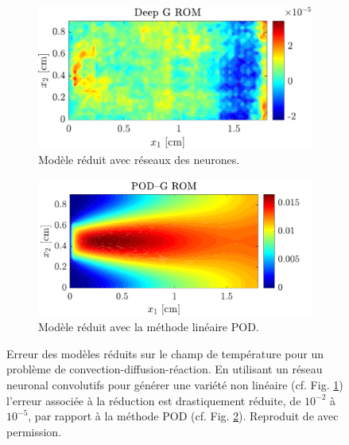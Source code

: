\documentclass[12pt, french]{article}
\begin{document}
	\begin{figure}[t]
		\begin{subfigure}[t]{0.465\textwidth}
			\includegraphics[width=\columnwidth]{DGROM_T_param1.pdf} 
			\caption{Modèle réduit avec réseaux des neurones.}
			\label{fig:DG_ROM}
		\end{subfigure}\hfill
		\begin{subfigure}[t]{0.48\textwidth}
			\includegraphics[width=\columnwidth]{GROM_T_param1.pdf}%
			\caption{Modèle réduit avec la méthode linéaire POD.}
			\label{fig:POD_ROM}
		\end{subfigure}
		\caption[]{Erreur des modèles réduits sur le champ de température pour un problème de convection-diffusion-réaction. En utilisant un réseau neuronal convolutifs pour générer une variété non linéaire (cf. Fig. \ref{fig:DG_ROM}) l'erreur associée à la réduction  est drastiquement réduite, de $10^{-2}$ à $10^{-5}$, par rapport à la méthode POD (cf. Fig. \ref{fig:POD_ROM}). Reproduit de \cite{lee2020} avec permission.}%
		\label{fig:deepROM}%
	\end{figure}
\end{document}
